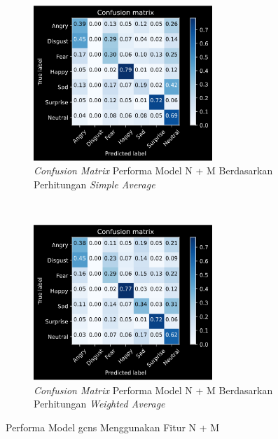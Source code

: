 \begin{figure}[t]
    \centering
    \begin{subfigure}[t]{6.75cm}
        \includegraphics[width=6.75cm]{gambar/eksperimen4b4_matriks1.png}
        \caption{\textit{Confusion Matrix} Performa Model N + M Berdasarkan Perhitungan \textit{Simple Average}}
        \label{fig:confusionmatrixeksperimen4b4}
    \end{subfigure}
    ~~~
    \begin{subfigure}[t]{6.75cm}
        \includegraphics[width=6.75cm]{gambar/eksperimen4b4_matriks2.png}
        \caption{\textit{Confusion Matrix} Performa Model N + M Berdasarkan Perhitungan \textit{Weighted Average}}
        \label{fig:confusionmatrixeksperimen4b4}
    \end{subfigure}
    \caption{Performa Model \acrshort{gcns} Menggunakan Fitur N + M}
    \label{fig:hasileksperimen4b4}
\end{figure}

